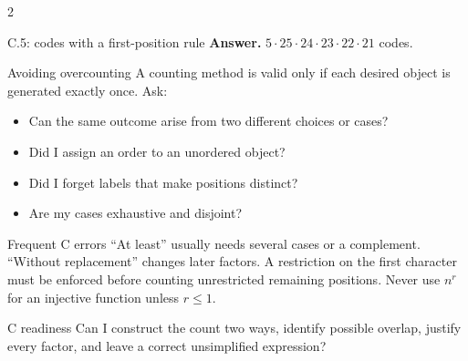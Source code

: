 \documentclass[10pt]{article}
\begin{document}
\begin{multicols}{2}
\begin{workedbox}{C.5: codes with a first-position rule}
\textbf{Answer.} $5\cdot25\cdot24\cdot23\cdot22\cdot21$ codes.
\end{workedbox}

\begin{definitionbox}{Avoiding overcounting}
A counting method is valid only if each desired object is generated exactly
once. Ask:
\begin{itemize}
  \item Can the same outcome arise from two different choices or cases?
  \item Did I assign an order to an unordered object?
  \item Did I forget labels that make positions distinct?
  \item Are my cases exhaustive and disjoint?
\end{itemize}
\end{definitionbox}

\begin{warningbox}{Frequent C errors}
``At least'' usually needs several cases or a complement. ``Without
replacement'' changes later factors. A restriction on the first character
must be enforced before counting unrestricted remaining positions. Never use
$n^r$ for an injective function unless $r\le1$.
\end{warningbox}

\begin{checklistbox}{C readiness}
Can I construct the count two ways, identify possible overlap, justify every
factor, and leave a correct unsimplified expression?
\end{checklistbox}
\end{multicols}
\end{document}
